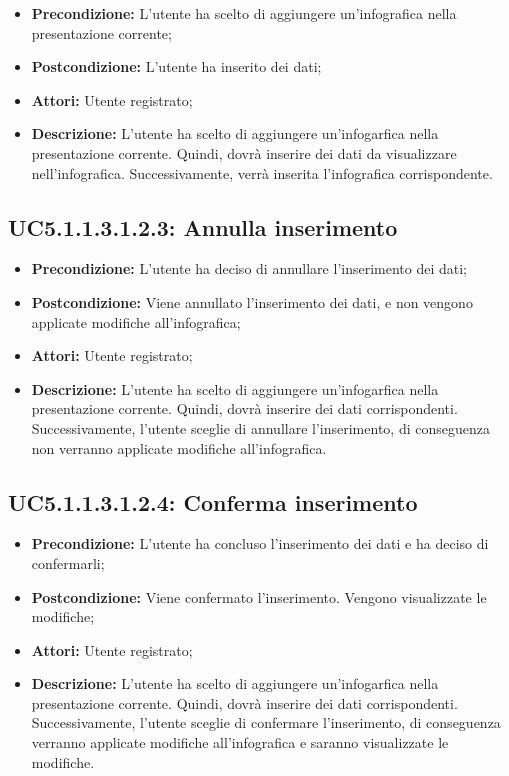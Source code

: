 \begin{itemize}
	\item \textbf{Precondizione:} L'utente ha scelto di aggiungere un'infografica nella presentazione corrente;
	\item \textbf{Postcondizione:} L'utente ha inserito dei dati;
	\item \textbf{Attori:} Utente registrato;
	\item \textbf{Descrizione:} L'utente ha scelto di aggiungere un'infogarfica nella presentazione corrente. Quindi, dovrà inserire dei dati da visualizzare nell'infografica. Successivamente, verrà inserita l'infografica corrispondente.
\end{itemize}
\subsection{ UC5.1.1.3.1.2.3: Annulla inserimento}

\begin{itemize}
	\item \textbf{Precondizione:} L'utente ha deciso di annullare l'inserimento dei dati;
	\item \textbf{Postcondizione:} Viene annullato l'inserimento dei dati, e non vengono applicate modifiche all'infografica;
	\item \textbf{Attori:} Utente registrato;
	\item \textbf{Descrizione:} L'utente ha scelto di aggiungere un'infogarfica nella presentazione corrente. Quindi, dovrà inserire dei dati corrispondenti. Successivamente, l'utente sceglie di annullare l'inserimento, di conseguenza non verranno applicate modifiche all'infografica.
\end{itemize}
\subsection{ UC5.1.1.3.1.2.4: Conferma inserimento}

\begin{itemize}
	\item \textbf{Precondizione:} L'utente ha concluso l'inserimento dei dati e ha deciso di confermarli;
	\item \textbf{Postcondizione:} Viene confermato l'inserimento. Vengono visualizzate le modifiche;
	\item \textbf{Attori:} Utente registrato;
	\item \textbf{Descrizione:} L'utente ha scelto di aggiungere un'infogarfica nella presentazione corrente. Quindi, dovrà inserire dei dati corrispondenti. Successivamente, l'utente sceglie di confermare l'inserimento, di conseguenza verranno applicate modifiche all'infografica e saranno visualizzate le modifiche.
\end{itemize}
